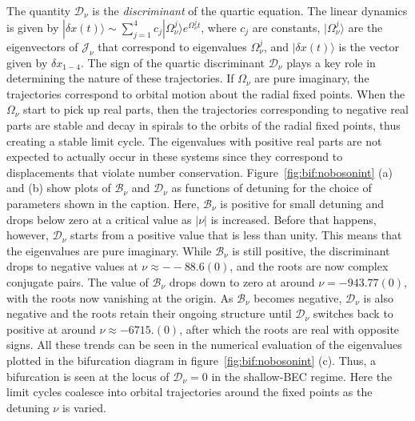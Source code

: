 \documentclass[a4paper,10pt]{report}
\begin{document}
The quantity $\mathcal{D}_\nu$ is the \textit{discriminant} of the quartic equation. The linear dynamics is given by $|\delta x (t) \rangle \sim \sum^{4}_{j=1} c_j |\Omega^j_\nu\rangle e^{\Omega^j_\nu t}$, where $c_j$ are constants, $|\Omega^j_\nu\rangle$ are the eigenvectors of $\mathcal{J}_\nu$  that correspond to eigenvalues $\Omega^j_\nu$, and $|\delta x (t) \rangle$ is the vector given by $\delta x_{1-4}$. The sign of the quartic discriminant $\mathcal{D}_\nu$ plays a key role in determining the nature of these trajectories. If $\Omega_\nu$ are pure imaginary, the trajectories correspond to orbital motion about the radial fixed points.  When the $\Omega_\nu$ start to pick up real parts, then the trajectories corresponding to negative real parts are stable and decay in spirals to the orbits of the radial fixed points, thus creating a stable limit cycle. The eigenvalues with positive real parts are not expected to actually occur in these systems since they correspond to displacements that violate number 
conservation. Figure~\ref{fig:bif:nobosonint} (a) and (b) show plots of $\mathcal{B}_\nu$ and $\mathcal{D}_\nu$ as functions of detuning for the choice of parameters shown in the caption. Here, $\mathcal{B}_\nu$ is positive for small detuning and drops below zero at a critical value as $|\nu|$ is increased. Before that happens, however, $\mathcal{D}_\nu$ starts from a positive value that is less than unity. This means that the eigenvalues are pure imaginary. While $\mathcal{B}_\nu$ is still positive, the discriminant drops to negative values at $\nu\approx--88.6(0)$, and the roots  are now complex conjugate pairs. The value of $\mathcal{B}_\nu$ drops down to zero at around $\nu=-943.77(0)$, with the roots now vanishing at the origin. As $\mathcal{B}_\nu$ becomes negative, $\mathcal{D}_\nu$ is also negative and the roots retain their ongoing structure until $\mathcal{D}_\nu$ switches back to positive at around $\nu\approx-6715.(0)$, after which the roots are real with opposite signs. All these trends can be 
seen in the numerical evaluation of the eigenvalues plotted in the bifurcation diagram in figure~\ref{fig:bif:nobosonint} (c). Thus, a bifurcation is seen at the locus of $\mathcal{D}_\nu=0$ in the shallow-BEC regime. Here the limit cycles coalesce into orbital trajectories around the fixed points as the detuning $\nu$ is varied. 
\end{document}
